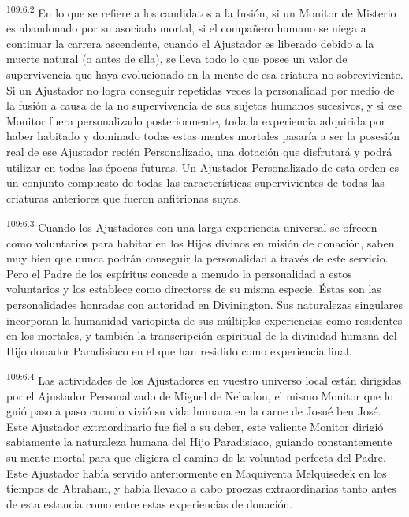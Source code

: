 \documentclass[twoside, 11pt]{book}
\begin{document}
\par
\textsuperscript{109:6.2} En lo que se refiere a los candidatos a la fusión, si un Monitor de Misterio es abandonado por su asociado mortal, si el compañero humano se niega a continuar la carrera ascendente, cuando el Ajustador es liberado debido a la muerte natural (o antes de ella), se lleva todo lo que posee un valor de supervivencia que haya evolucionado en la mente de esa criatura no sobreviviente. Si un Ajustador no logra conseguir repetidas veces la personalidad por medio de la fusión a causa de la no supervivencia de sus sujetos humanos sucesivos, y si ese Monitor fuera personalizado posteriormente, toda la experiencia adquirida por haber habitado y dominado todas estas mentes mortales pasaría a ser la posesión real de ese Ajustador recién Personalizado, una dotación que disfrutará y podrá utilizar en todas las épocas futuras. Un Ajustador Personalizado de esta orden es un conjunto compuesto de todas las características supervivientes de todas las criaturas anteriores que fueron anfitrionas suyas.

\par
\textsuperscript{109:6.3} Cuando los Ajustadores con una larga experiencia universal se ofrecen como voluntarios para habitar en los Hijos divinos en misión de donación, saben muy bien que nunca podrán conseguir la personalidad a través de este servicio. Pero el Padre de los espíritus concede a menudo la personalidad a estos voluntarios y los establece como directores de su misma especie. Éstas son las personalidades honradas con autoridad en Divinington. Sus naturalezas singulares incorporan la humanidad variopinta de sus múltiples experiencias como residentes en los mortales, y también la transcripción espiritual de la divinidad humana del Hijo donador Paradisiaco en el que han residido como experiencia final.

\par
\textsuperscript{109:6.4} Las actividades de los Ajustadores en vuestro universo local están dirigidas por el Ajustador Personalizado de Miguel de Nebadon, el mismo Monitor que lo guió paso a paso cuando vivió su vida humana en la carne de Josué ben José. Este Ajustador extraordinario fue fiel a su deber, este valiente Monitor dirigió sabiamente la naturaleza humana del Hijo Paradisiaco, guiando constantemente su mente mortal para que eligiera el camino de la voluntad perfecta del Padre. Este Ajustador había servido anteriormente en Maquiventa Melquisedek en los tiempos de Abraham, y había llevado a cabo proezas extraordinarias tanto antes de esta estancia como entre estas experiencias de donación.
\end{document}
